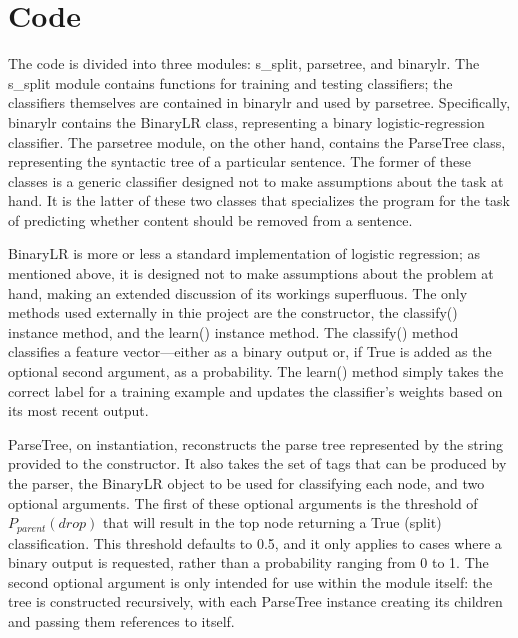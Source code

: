 \documentclass{article}
\begin{document}
\section*{Code}

The code is divided into three modules: s\_split, parsetree, and binarylr. The s\_split module contains functions for training and testing classifiers; the classifiers themselves are contained in binarylr and used by parsetree. Specifically, binarylr contains the BinaryLR class, representing a binary logistic-regression classifier. The parsetree module, on the other hand, contains the ParseTree class, representing the syntactic tree of a particular sentence. The former of these classes is a generic classifier designed not to make assumptions about the task at hand. It is the latter of these two classes that specializes the program for the task of predicting whether content should be removed from a sentence.

BinaryLR is more or less a standard implementation of logistic regression; as mentioned above, it is designed not to make assumptions about the problem at hand, making an extended discussion of its workings superfluous. The only methods used externally in thie project are the constructor, the classify() instance method, and the learn() instance method. The classify() method classifies a feature vector---either as a binary output or, if True is added as the optional second argument, as a probability. The learn() method simply takes the correct label for a training example and updates the classifier's weights based on its most recent output.

ParseTree, on instantiation, reconstructs the parse tree represented by the string provided to the constructor. It also takes the set of tags that can be produced by the parser, the BinaryLR object to be used for classifying each node, and two optional arguments. The first of these optional arguments is the threshold of $P_{parent}(drop)$ that will result in the top node returning a True (split) classification. This threshold defaults to 0.5, and it only applies to cases where a binary output is requested, rather than a probability ranging from 0 to 1. The second optional argument is only intended for use within the module itself: the tree is constructed recursively, with each ParseTree instance creating its children and passing them references to itself.
\end{document}
